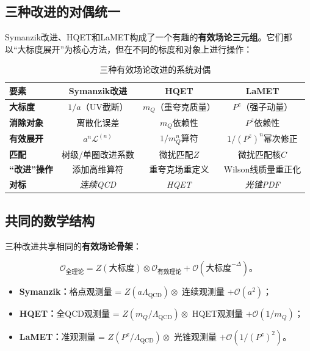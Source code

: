 \documentclass[12pt,a4paper]{ctexart}
\theoremstyle{definition}
\begin{document}
\subsection{三种改进的对偶统一}

Symanzik改进、HQET和LaMET构成了一个有趣的\textbf{有效场论三元组}。它们都以``大标度展开''为核心方法，但在不同的标度和对象上进行操作：

\begin{table}[H]
\centering
\caption{三种有效场论改进的系统对偶}
\label{tab:three_EFT}
\begin{tabular}{lccc}
\toprule
要素 & Symanzik改进 & HQET & LaMET \\
\midrule
\textbf{大标度}     & $1/a$（UV截断） & $m_Q$（重夸克质量） & $P^z$（强子动量） \\
\textbf{消除对象}   & 离散化误差  & $m_Q$依赖性  & $P^z$依赖性 \\
\textbf{有效展开}   & $a^n \mathcal{L}^{(n)}$ & $1/m_Q^n$算符 & $1/(P^z)^n$幂次修正 \\
\textbf{匹配}       & 树级/单圈改进系数 & 微扰匹配$Z$ & 微扰匹配核$C$ \\
\textbf{``改进''操作}& 添加高维算符 & 重夸克场重定义 & Wilson线质量重正化 \\
\textbf{对标}       & \textit{连续QCD} & \textit{HQET} & \textit{光锥PDF} \\
\bottomrule
\end{tabular}
\end{table}

\subsection{共同的数学结构}

三种改进共享相同的\textbf{有效场论骨架}：

\begin{equation}
\mathcal{O}_{\text{全理论}} = Z(\text{大标度}) \otimes \mathcal{O}_{\text{有效理论}} + \mathcal{O}(\text{大标度}^{-\Delta})。
\end{equation}

\begin{itemize}
    \item \textbf{Symanzik：}格点观测量 = $Z(a\Lambda_{\text{QCD}}) \otimes$ 连续观测量 $+ \mathcal{O}(a^2)$；
    \item \textbf{HQET：}全QCD观测量 = $Z(m_Q/\Lambda_{\text{QCD}}) \otimes$ HQET观测量 $+ \mathcal{O}(1/m_Q)$\cite{Ji2014LaMET}；
    \item \textbf{LaMET：}准观测量 = $Z(P^z/\Lambda_{\text{QCD}}) \otimes$ 光锥观测量 $+ \mathcal{O}(1/(P^z)^2)$\cite{Ji2014LaMET}。
\end{itemize}
\end{document}
